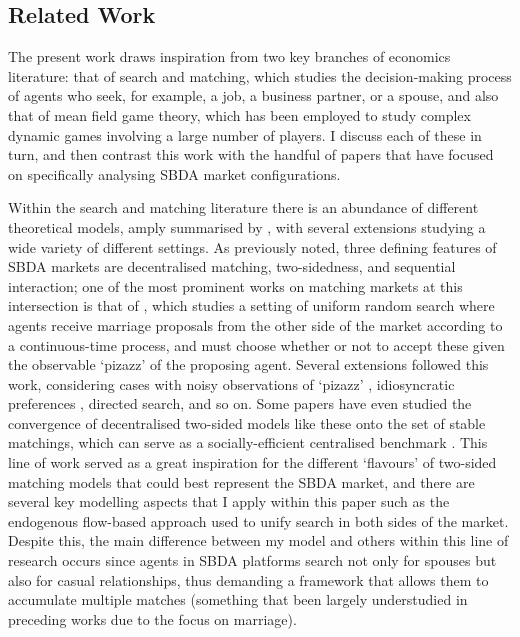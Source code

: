 \subsection{Related Work}
The present work draws inspiration from two key branches of economics literature: that of search and matching, which studies the decision-making process of agents who seek, for example, a job, a business partner, or a spouse, and also that of mean field game theory, which has been employed to study complex dynamic games involving a large number of players. I discuss each of these in turn, and then contrast this work with the handful of papers that have focused on specifically analysing SBDA market configurations.

Within the search and matching literature there is an abundance of different theoretical models, amply summarised by \cite{chade2017sorting}, with several extensions studying a wide variety of different settings. As previously noted, three defining features of SBDA markets are decentralised matching, two-sidedness, and sequential interaction; one of the most prominent works on matching markets at this intersection is that of \cite{burdett1997marriage}, which studies a setting of uniform random search where agents receive marriage proposals from the other side of the market according to a continuous-time process, and must choose whether or not to accept these given the observable `pizazz' of the proposing agent. Several extensions followed this work, considering cases with noisy observations of `pizazz' \citep{chade2006matching}, idiosyncratic preferences \citep{burdett1998two}, directed search, and so on. Some papers have even studied the convergence of decentralised two-sided models like these onto the set of stable matchings, which can serve as a socially-efficient centralised benchmark \citep{adachi2003search}. This line of work served as a great inspiration for the different `flavours' of two-sided matching models that could best represent the SBDA market, and there are several key modelling aspects that I apply within this paper such as the endogenous flow-based approach used to unify search in both sides of the market. Despite this, the main difference between my model and others within this line of research occurs since agents in SBDA platforms search not only for spouses but also for casual relationships, thus demanding a framework that allows them to accumulate multiple matches (something that been largely understudied in preceding works due to the focus on marriage). 

